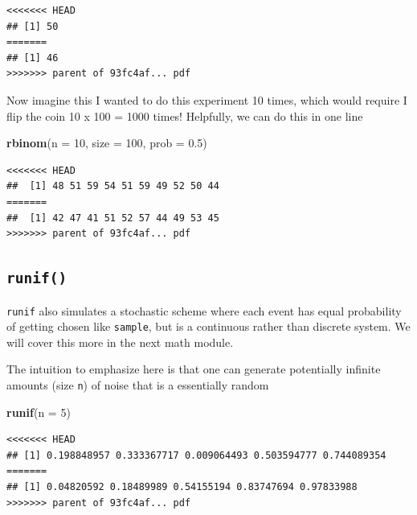 \documentclass[]{book}
\newenvironment{Shaded}{\begin{snugshade}}{\end{snugshade}}
\newcommand{\DataTypeTok}[1]{\textcolor[rgb]{0.13,0.29,0.53}{#1}}
\newcommand{\DecValTok}[1]{\textcolor[rgb]{0.00,0.00,0.81}{#1}}
\newcommand{\FloatTok}[1]{\textcolor[rgb]{0.00,0.00,0.81}{#1}}
\newcommand{\KeywordTok}[1]{\textcolor[rgb]{0.13,0.29,0.53}{\textbf{#1}}}
\newcommand{\NormalTok}[1]{#1}
\theoremstyle{definition}
\theoremstyle{definition}
\theoremstyle{definition}
\theoremstyle{remark}
\begin{document}
\begin{Shaded}
\begin{Highlighting}[]
\begin{Shaded}
\begin{Highlighting}[]
\begin{Shaded}
\begin{Highlighting}[]
\begin{verbatim}
<<<<<<< HEAD
## [1] 50
=======
## [1] 46
>>>>>>> parent of 93fc4af... pdf
\end{verbatim}

Now imagine this I wanted to do this experiment 10 times, which would require I flip the coin 10 x 100 = 1000 times! Helpfully, we can do this in one line

\begin{Shaded}
\begin{Highlighting}[]
\KeywordTok{rbinom}\NormalTok{(}\DataTypeTok{n =} \DecValTok{10}\NormalTok{, }\DataTypeTok{size =} \DecValTok{100}\NormalTok{, }\DataTypeTok{prob =} \FloatTok{0.5}\NormalTok{)}
\end{Highlighting}
\end{Shaded}

\begin{verbatim}
<<<<<<< HEAD
##  [1] 48 51 59 54 51 59 49 52 50 44
=======
##  [1] 42 47 41 51 52 57 44 49 53 45
>>>>>>> parent of 93fc4af... pdf
\end{verbatim}

\hypertarget{runif}{%
\subsection*{\texorpdfstring{\texttt{runif()}}{runif()}}\label{runif}}

\texttt{runif} also simulates a stochastic scheme where each event has equal probability of getting chosen like \texttt{sample}, but is a continuous rather than discrete system. We will cover this more in the next math module.

The intuition to emphasize here is that one can generate potentially infinite amounts (size \texttt{n}) of noise that is a essentially random

\begin{Shaded}
\begin{Highlighting}[]
\KeywordTok{runif}\NormalTok{(}\DataTypeTok{n =} \DecValTok{5}\NormalTok{)}
\end{Highlighting}
\end{Shaded}

\begin{verbatim}
<<<<<<< HEAD
## [1] 0.198848957 0.333367717 0.009064493 0.503594777 0.744089354
=======
## [1] 0.04820592 0.18489989 0.54155194 0.83747694 0.97833988
>>>>>>> parent of 93fc4af... pdf
\end{verbatim}


\end{Highlighting}
\end{Shaded}
\end{Highlighting}
\end{Shaded}
\end{Highlighting}
\end{Shaded}
\end{document}
